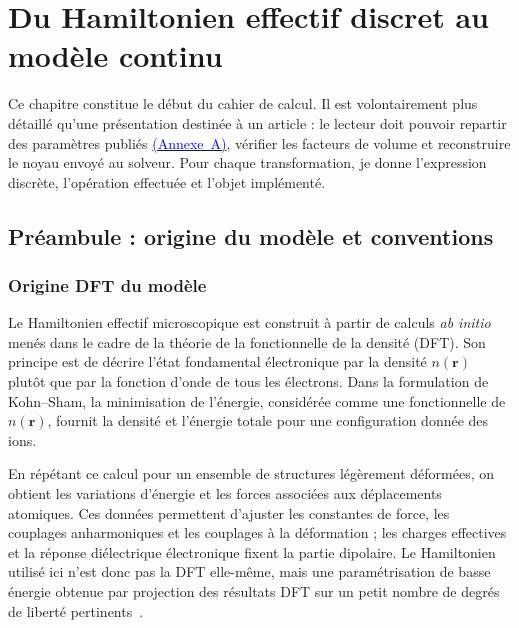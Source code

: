 
\section{Du Hamiltonien effectif discret au modèle continu}
\label{ann:hamiltonien_continu}

Ce chapitre constitue le début du cahier de calcul. Il est volontairement plus
détaillé qu'une présentation destinée à un article : le lecteur doit pouvoir
repartir des paramètres publiés
\hyperref[sec:core_parameter_sets]{\textcolor{blue}{(Annexe~A)}}, vérifier les
facteurs de volume et reconstruire le noyau envoyé au solveur. Pour chaque transformation, je donne l'expression
discrète, l'opération effectuée et l'objet implémenté.

\subsection{Préambule : origine du modèle et conventions}
\label{sec:origin_dft}

\subsubsection{Origine DFT du modèle}
Le Hamiltonien effectif microscopique est construit à partir de calculs
\emph{ab initio} menés dans le cadre de la théorie de la fonctionnelle de la
densité (DFT). Son principe est de décrire l'état fondamental électronique par
la densité $n(\mathbf r)$ plutôt que par la fonction d'onde de tous les
électrons. Dans la formulation de Kohn--Sham, la minimisation de l'énergie,
considérée comme une fonctionnelle de $n(\mathbf r)$, fournit la densité et
l'énergie totale pour une configuration donnée des ions.

En répétant ce calcul pour un ensemble de structures légèrement déformées, on
obtient les variations d'énergie et les forces associées aux déplacements
atomiques. Ces données permettent d'ajuster les constantes de force, les
couplages anharmoniques et les couplages à la déformation ; les charges
effectives et la réponse diélectrique électronique fixent la partie dipolaire.
Le Hamiltonien utilisé ici n'est donc pas la DFT elle-même, mais une
paramétrisation de basse énergie obtenue par projection des résultats DFT sur
un petit nombre de degrés de liberté pertinents~\cite{Zhong1994}.

